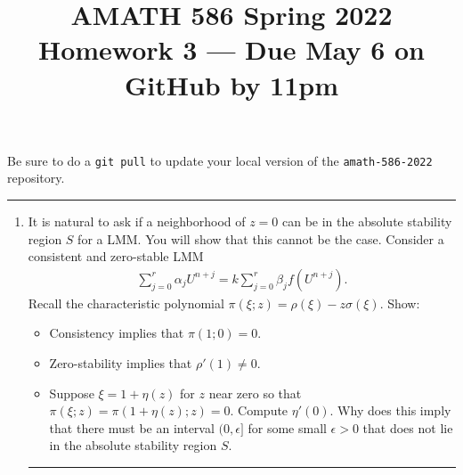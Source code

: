 \documentclass[10pt]{amsart}
\begin{document}
\pagestyle{empty}

\newcommand{\mline}{\vspace{.2in}\hrule\vspace{.2in}}


\title{\bf { AMATH 586 Spring 2022 \\ Homework 3 ---
Due May 6 on GitHub by 11pm} }
\maketitle
\centerline{Be sure to do a {\tt git pull} to update your local version of the {\tt amath-586-2022} repository.}

\mline
\begin{enumerate}[label={\bf Problem~{\arabic*}:}]
\item It is natural to ask if a neighborhood of $z = 0$ can be in the absolute stability region $S$ for a LMM.  You will show that this cannot be the case.  Consider a consistent and zero-stable LMM
  \begin{align*}
    \sum_{j=0}^r \alpha_j U^{n+j} = k \sum_{j=0}^r \beta_j f(U^{n+j}).
  \end{align*}
  Recall the characteristic polynomial $\pi(\xi;z) = \rho(\xi) - z \sigma(\xi)$. Show:
  \begin{itemize}
  \item Consistency implies that $\pi(1;0) = 0$.
  \item Zero-stability implies that $\rho'(1) \neq 0$.
  \item Suppose $\xi = 1 + \eta(z)$ for $z$ near zero so that $\pi(\xi;z) = \pi(1 + \eta(z);z) = 0$.  Compute $\eta'(0)$.  Why does this imply that there must be an interval $(0,\epsilon]$ for some small $\epsilon > 0$ that does not lie in the absolute stability region $S$.  
  \end{itemize}

  \mline
  

\end{enumerate}
\end{document}

